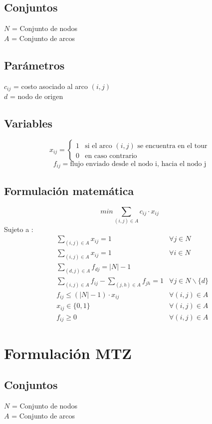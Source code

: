 \documentclass{article}
\numberwithin{equation}{section}
\begin{document}
\subsection{Conjuntos}
$N$ = Conjunto de nodos\\
$A$ = Conjunto de arcos
\subsection{Parámetros}
$c_{ij}$ = costo asociado al arco $(i,j)$\\
$d$ = nodo de origen
\subsection{Variables}
\begin{flushleft}
\[x_{ij}={\begin{cases}1&{\mbox{si el arco $(i,j)$ se encuentra en el tour}}\\0&{\mbox{en caso contrario}}\end{cases}}
\]
\[f_{ij} = \mbox{flujo enviado desde el nodo i, hacia el nodo j}\]
\end{flushleft}
\subsection{Formulación matemática}
\begin{equation}
min \sum_{(i,j) \in A} c_{ij} \cdot x_{ij}
\end{equation}
Sujeto a : \begin{align}
& \sum_{(i,j) \in A} x_{ij} = 1 &\forall j \in N \\
& \sum_{(i,j) \in A} x_{ij} = 1 &\forall i \in N \\
& \sum_{(d,j) \in A} f_{dj} = |N| - 1 \\
& \sum_{(i,j) \in A} f_{ij} - \sum_{(j,h) \in A} f_{jh} = 1 &\forall j \in N \backslash \{d\} \\
& f_{ij} \leq (|N| - 1) \cdot  x_{ij} & \forall (i,j) \in A\\
& x_{ij} \in \{0,1\} &\forall (i,j) \in A\\
& f_{ij} \geq 0 &\forall (i,j) \in A
\end{align}

\newpage
\section{Formulación MTZ}
\subsection{Conjuntos}
$N$ = Conjunto de nodos\\
$A$ = Conjunto de arcos
\end{document}
